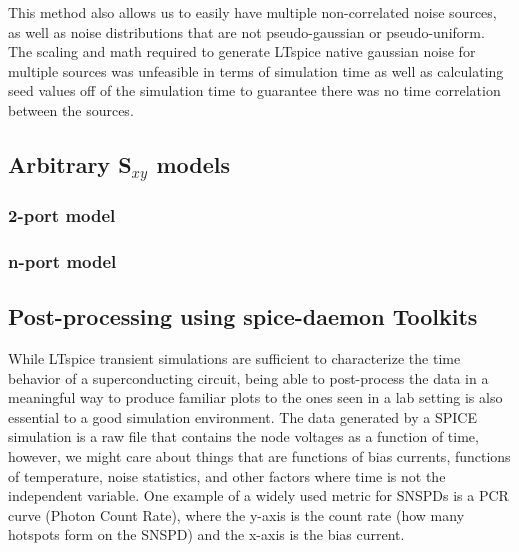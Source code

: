 \documentclass{article}
\begin{document}
This method also allows us to easily have multiple non-correlated noise sources, as well as noise 
distributions that are not pseudo-gaussian or pseudo-uniform. The scaling and math required to generate
LTspice native gaussian noise for multiple sources was unfeasible in terms of simulation time as well
as calculating seed values off of the simulation time to guarantee there was no time correlation between
the sources.


\subsection{Arbitrary S$_{xy}$ models}


\subsubsection{2-port model}


\subsubsection{n-port model}


\subsection{Post-processing using spice-daemon Toolkits}

While LTspice transient simulations are sufficient to characterize the time behavior of a superconducting 
circuit, being able to post-process the data in a meaningful way to produce familiar plots to the ones
seen in a lab setting is also essential to a good simulation environment. 
The data generated by a SPICE simulation is a raw file
that contains the node voltages as a function of time, however, we might care about things that are functions
of bias currents, functions of temperature, noise statistics, and other factors where time is not the
independent variable. One example of a widely used metric for SNSPDs is a PCR curve (Photon Count Rate), where
the y-axis is the count rate (how many hotspots form on the SNSPD) and the x-axis is the bias current.
\end{document}
